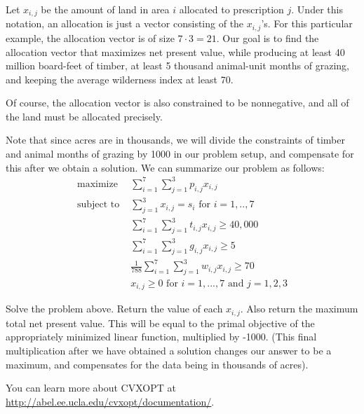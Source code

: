 Let $x_{i,j}$ be the amount of land in area $i$ allocated to prescription $j$.
Under this notation, an allocation is just a vector consisting of the $x_{i,j}$'s. For this particular
example, the allocation vector is of size $7\cdot 3 = 21$. 
Our goal is to find the allocation vector that maximizes net present value, while producing at least 40 million
board-feet of timber, at least 5 thousand animal-unit months of grazing, and keeping the average wilderness index at least 70.

Of course, the allocation vector is also constrained to be nonnegative, and all of the land must be allocated precisely. 

Note that since acres are in thousands, we will divide the constraints of timber and animal months of grazing by 1000 in our problem setup, and compensate for this after we obtain a solution. We can summarize our problem as follows:
\begin{align*}
\text{maximize } &\sum\limits_{i=1}^7 \sum\limits_{j=1}^3 p_{i,j}x_{i,j} \\
\text{subject to } &\sum\limits_{j=1}^3 x_{i,j} = s_i  \text{ for } i=1,..,7 \\
	        &\sum\limits_{i=1}^7 \sum\limits_{j=1}^3 t_{i,j}x_{i,j} \geq 40,000 \\
		&\sum\limits_{i=1}^7 \sum\limits_{j=1}^3 g_{i,j}x_{i,j} \geq 5 \\
		&\frac{1}{788} \sum\limits_{i=1}^7 \sum\limits_{j=1}^3 w_{i,j}x_{i,j} \geq 70 \\
		&x_{i,j} \geq 0 \text{ for } i=1,...,7  \text{ and } j=1,2,3
\end{align*}

\begin{problem}
Solve the problem above. Return the value of each $x_{i,j}$. 
Also return the maximum total net present value. This will be equal to the primal objective of the appropriately minimized linear function, multiplied by -1000. (This final multiplication after we have obtained a solution changes our answer to be a maximum, and compensates for the data being in thousands of acres).
\end{problem} 

You can learn more about CVXOPT at
\url{http://abel.ee.ucla.edu/cvxopt/documentation/}.
